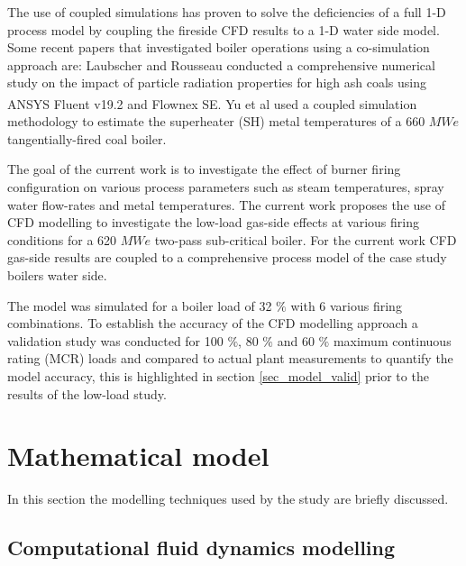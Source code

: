 \documentclass[review]{elsarticle}
\begin{document}
The use of coupled simulations has proven to solve the deficiencies of a full 1-D process model by coupling the fireside CFD results to a 1-D water side model. Some recent papers that investigated boiler operations using a co-simulation approach are: Laubscher and Rousseau \cite{Laubscher2020} conducted a comprehensive numerical study on the impact of particle radiation properties for high ash coals using ANSYS Fluent v19.2\textsuperscript{\textregistered} and Flownex SE\textsuperscript{\textregistered}. Yu et al \cite{Yu2019} used a coupled simulation methodology to estimate the superheater (SH) metal temperatures of a 660 $MWe$ tangentially-fired coal boiler.

The goal of the current work is to investigate the effect of burner firing configuration on various process parameters such as steam temperatures, spray water flow-rates and metal temperatures. The current work proposes the use of CFD modelling  to investigate the low-load gas-side effects at various firing conditions for a 620 $MWe$ two-pass sub-critical boiler. For the current work CFD gas-side results are coupled to a comprehensive process model of the case study boilers water side. 

The model was simulated for a boiler load of 32 $\%$  with 6 various firing combinations. To establish the accuracy of the CFD modelling approach a validation study was conducted for 100 $\%$, 80 $\%$ and 60 $\%$ maximum continuous rating (MCR) loads and compared to actual plant measurements to quantify the model accuracy, this is highlighted in section \ref{sec_model_valid} prior to the results of the low-load study. 

\section{Mathematical model}
In this section the modelling techniques used by the study are briefly discussed.
\subsection{Computational fluid dynamics modelling}
\end{document}
